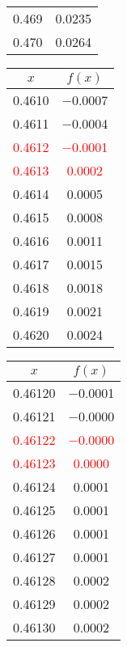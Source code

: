 \documentclass{article}
\begin{document}
\begin{enumerate}
\begin{enumerate}
\begin{tabular}{|c|c|}
            \num{0,469} & \num{0,0235} \\
            \num{0,470} & \num{0,0264} \\
            \hline
            \end{tabular}\quad
            \begin{tabular}{|c|c|}
            \hline
            $x$   & $f(x)$ \\
            \hline
            \num{0,4610} & \num{-0,0007} \\
            \num{0,4611} & \num{-0,0004} \\
            \textcolor{red}{\num{0,4612}} & \textcolor{red}{\num{-0,0001}} \\
            \textcolor{red}{\num{0,4613}} & \textcolor{red}{\num{0,0002}} \\
            \num{0,4614} & \num{0,0005} \\
            \num{0,4615} & \num{0,0008} \\
            \num{0,4616} & \num{0,0011} \\
            \num{0,4617} & \num{0,0015} \\
            \num{0,4618} & \num{0,0018} \\
            \num{0,4619} & \num{0,0021} \\
            \num{0,4620} & \num{0,0024} \\
            \hline
            \end{tabular}\quad
            \begin{tabular}{|c|c|}
            \hline
            $x$   & $f(x)$ \\
            \hline
            \num{0,46120} & \num{-0,0001} \\
            \num{0,46121} & \num{-0,0000} \\
            \textcolor{red}{\num{0,46122}} & \textcolor{red}{\num{-0,0000}} \\
            \textcolor{red}{\num{0,46123}} & \textcolor{red}{\num{0,0000}} \\
            \num{0,46124} & \num{0,0001} \\
            \num{0,46125} & \num{0,0001} \\
            \num{0,46126} & \num{0,0001} \\
            \num{0,46127} & \num{0,0001} \\
            \num{0,46128} & \num{0,0002} \\
            \num{0,46129} & \num{0,0002} \\
            \num{0,46130} & \num{0,0002} \\
            \hline
            \end{tabular}\quad \\
    

\end{enumerate}
\end{enumerate}
\end{document}
